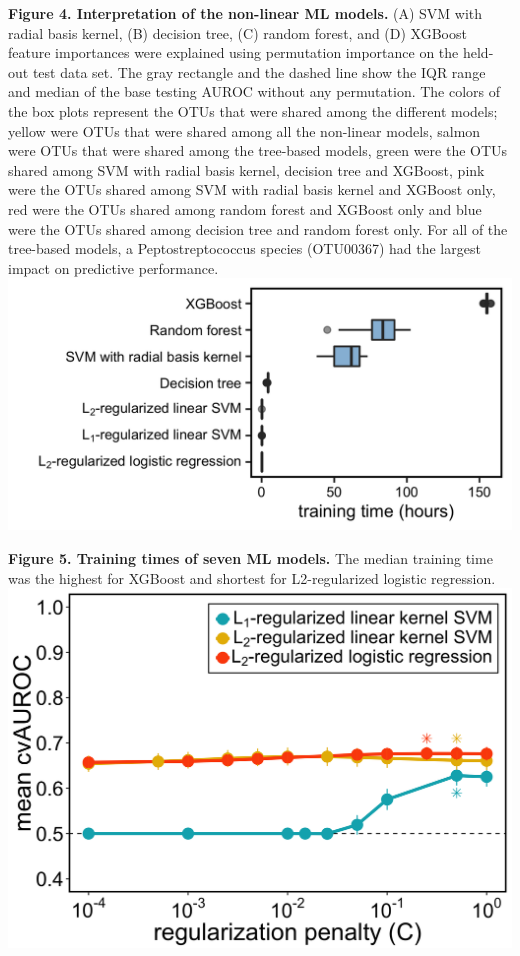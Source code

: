 \documentclass[11pt,]{article}
\begin{document}
\textbf{Figure 4. Interpretation of the non-linear ML models.} (A) SVM
with radial basis kernel, (B) decision tree, (C) random forest, and (D)
XGBoost feature importances were explained using permutation importance
on the held-out test data set. The gray rectangle and the dashed line
show the IQR range and median of the base testing AUROC without any
permutation. The colors of the box plots represent the OTUs that were
shared among the different models; yellow were OTUs that were shared
among all the non-linear models, salmon were OTUs that were shared among
the tree-based models, green were the OTUs shared among SVM with radial
basis kernel, decision tree and XGBoost, pink were the OTUs shared among
SVM with radial basis kernel and XGBoost only, red were the OTUs shared
among random forest and XGBoost only and blue were the OTUs shared among
decision tree and random forest only. For all of the tree-based models,
a Peptostreptococcus species (OTU00367) had the largest impact on
predictive performance. \newpage
\includegraphics{Figure_5.png}

\textbf{Figure 5. Training times of seven ML models.} The median
training time was the highest for XGBoost and shortest for
L2-regularized logistic regression. \newpage
\includegraphics{Figure_S1.png}
\end{document}

